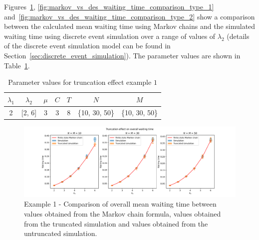 Figures~\ref{fig:markov_vs_des_waiting_time_comparison_overall},
\ref{fig:markov_vs_des_waiting_time_comparison_type_1}
and~\ref{fig:markov_vs_des_waiting_time_comparison_type_2} show a
comparison between the calculated mean waiting time using Markov chains and the
simulated waiting time using discrete event simulation over a range of values of
\(\lambda_2\) (details of the discrete event simulation model can be found in
Section~\ref{sec:discrete_event_simulation}).
The parameter values are shown in
Table~\ref{tab:truncation_effect_example_1}.

\begin{table}[H]
    \centering
    \caption{Parameter values for truncation effect example \(1\)}
    \begin{tabular}{||c|c|c|c|c|c|c||}
        \hline
        \(\lambda_1\) & \(\lambda_2\) & \(\mu\) & \(C\) & \(T\) & \(N\) & \(M\) \\
        \hline
        2 & [2, 6] & 3 & 3 & 8 & \{10, 30, 50\} & \{10, 30, 50\} \\
        \hline
    \end{tabular}
    \label{tab:truncation_effect_example_1}
\end{table}

\begin{figure}[H]
    \includegraphics[width=\textwidth]{chapters/03_queueing_model/Bin/numeric_results_and_timings/truncation_effect/waiting_time_overall.pdf}
    \caption{
        Example 1 - Comparison of overall mean waiting time between values
        obtained from the
        Markov chain formula, values obtained from the truncated simulation and
        values obtained from the untruncated simulation.
    }
    \label{fig:markov_vs_des_waiting_time_comparison_overall}
\end{figure}

